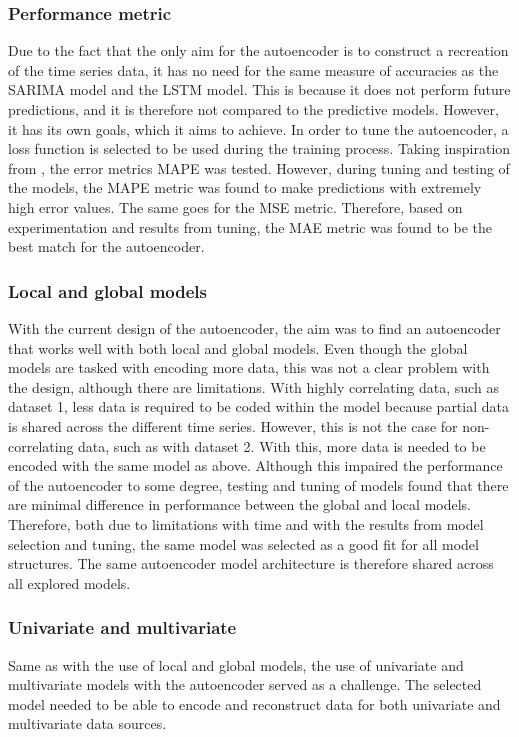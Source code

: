 \subsubsection{Performance metric}
Due to the fact that the only aim for the autoencoder is to construct a recreation of the time series data,
it has no need for the same measure of accuracies as the SARIMA model and the LSTM model.
This is because it does not perform future predictions, and it is therefore not compared to the predictive models.
However, it has its own goals, which it aims to achieve.
In order to tune the autoencoder, a loss function is selected to be used during the training process.
Taking inspiration from \cite{Zhao2019}, the error metrics MAPE was tested.
However, during tuning and testing of the models, the MAPE metric was found to make predictions with extremely high error values.
The same goes for the MSE metric.
Therefore, based on experimentation and results from tuning,
the MAE metric was found to be the best match for the autoencoder.


\subsubsection{Local and global models}
With the current design of the autoencoder, the aim was to find an autoencoder that works well with both local and global models.
Even though the global models are tasked with encoding more data, this was not a clear problem with the design, although there are limitations.
With highly correlating data, such as dataset 1, less data is required to be coded within the model because partial data is shared across the different time series.
However, this is not the case for non-correlating data, such as with dataset 2.
With this, more data is needed to be encoded with the same model as above.
Although this impaired the performance of the autoencoder to some degree, testing and tuning of models found that there are minimal difference in performance between the global and local models.
Therefore, both due to limitations with time and with the results from model selection and tuning,
the same model was selected as a good fit for all model structures.
The same autoencoder model architecture is therefore shared across all explored models.

\subsubsection{Univariate and multivariate}
Same as with the use of local and global models,
the use of univariate and multivariate models with the autoencoder served as a challenge.
The selected model needed to be able to encode and reconstruct data for both univariate and multivariate data sources.

